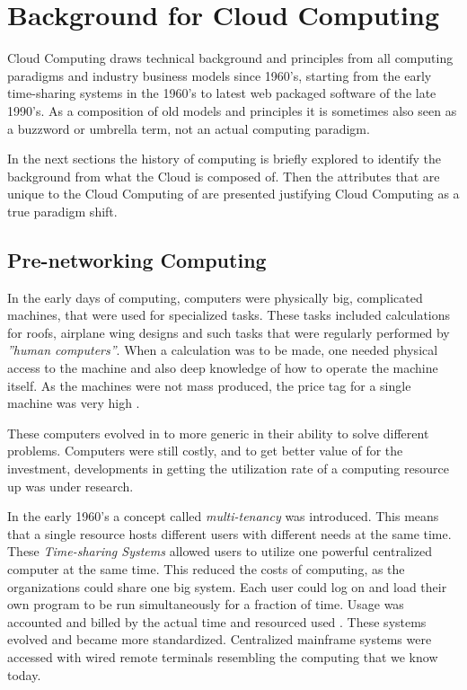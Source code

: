 \documentclass{tktltiki}
\begin{document}
\section{Background for Cloud Computing}

Cloud Computing draws technical background and principles from all computing paradigms and industry business models since 1960's, starting from the early time-sharing systems in the 1960's to latest web packaged software of the late 1990's.  As a composition of old models and principles it is sometimes also seen as a buzzword or umbrella term, not an actual computing paradigm.

In the next sections the history of computing is briefly explored to identify the background from what the Cloud is composed of.  Then the attributes that are unique to the Cloud Computing of are presented justifying Cloud Computing as a true paradigm shift.
        
      
      

\subsection{Pre-networking Computing}
In the early days of computing, computers were physically big, complicated machines, that were used for specialized tasks.  These tasks included calculations for roofs, airplane wing designs and such tasks that were regularly performed by \emph{''human computers''}.  When a calculation was to be made, one needed physical access to the machine and also deep knowledge of how to operate the machine itself.  As the machines were not mass produced, the price tag for a single machine was very high \cite{zuse}.

These computers evolved in to more generic in their ability to solve different problems.  Computers were still costly, and to get better value of for the investment, developments in getting the utilization rate of a computing resource up was under research.

In the early 1960's a concept called \emph{multi-tenancy} was introduced.  This means that a single resource hosts different users with different needs at the same time.  These \emph{Time-sharing Systems} allowed users to utilize one powerful centralized computer at the same time.   This reduced the costs of computing, as the organizations could share one big system.  Each user could log on and load their own program to be run simultaneously for a fraction of time.  Usage was accounted and billed by the actual time and resourced used \cite{timesharing}.  These systems evolved and became more standardized.  Centralized mainframe systems were accessed with wired remote terminals resembling the computing that we know today.
\end{document}
